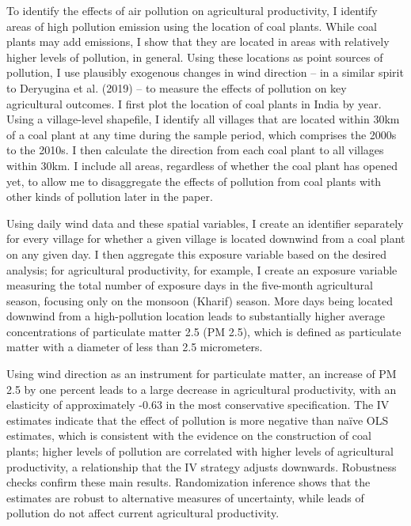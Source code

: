 \documentclass[
]{article}
\begin{document}
To identify the effects of air pollution on agricultural productivity, I identify areas of high pollution emission using the location of coal plants. While coal plants may add emissions, I show that they are located in areas with relatively higher levels of pollution, in general. Using these locations as point sources of pollution, I use plausibly exogenous changes in wind direction -- in a similar spirit to Deryugina et al. (2019) -- to measure the effects of pollution on key agricultural outcomes. I first plot the location of coal plants in India by year. Using a village-level shapefile, I identify all villages that are located within 30km of a coal plant at any time during the sample period, which comprises the 2000s to the 2010s. I then calculate the direction from each coal plant to all villages within 30km. I include all areas, regardless of whether the coal plant has opened yet, to allow me to disaggregate the effects of pollution from coal plants with other kinds of pollution later in the paper.

Using daily wind data and these spatial variables, I create an identifier separately for every village for whether a given village is located downwind from a coal plant on any given day. I then aggregate this exposure variable based on the desired analysis; for agricultural productivity, for example, I create an exposure variable measuring the total number of exposure days in the five-month agricultural season, focusing only on the monsoon (Kharif) season. More days being located downwind from a high-pollution location leads to substantially higher average concentrations of particulate matter 2.5 (PM 2.5), which is defined as particulate matter with a diameter of less than 2.5 micrometers.

Using wind direction as an instrument for particulate matter, an increase of PM 2.5 by one percent leads to a large decrease in agricultural productivity, with an elasticity of approximately -0.63 in the most conservative specification. The IV estimates indicate that the effect of pollution is more negative than naïve OLS estimates, which is consistent with the evidence on the construction of coal plants; higher levels of pollution are correlated with higher levels of agricultural productivity, a relationship that the IV strategy adjusts downwards. Robustness checks confirm these main results. Randomization inference shows that the estimates are robust to alternative measures of uncertainty, while leads of pollution do not affect current agricultural productivity.
\end{document}
